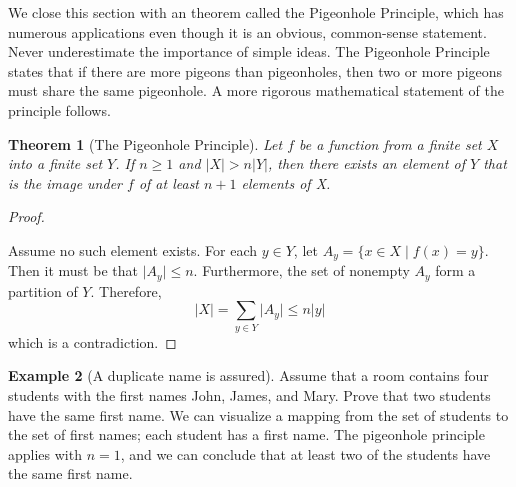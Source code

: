 \documentclass[10pt,]{book}
\theoremstyle{plain}
\newtheorem{theorem}{Theorem}[section]
\theoremstyle{definition}
\theoremstyle{definition}
\newtheorem{example}[theorem]{Example}
\theoremstyle{definition}
\begin{document}
We close this section with an theorem called the Pigeonhole Principle, which has numerous applications even though it is an obvious, common-sense statement. Never underestimate the importance of simple ideas. The Pigeonhole Principle states that if there are more pigeons than
pigeonholes, then two or more pigeons must share the same pigeonhole. A more rigorous mathematical statement of the principle follows.%
\begin{theorem}[The Pigeonhole Principle]\label{th-pigeonhole-principle}
Let \(f\) be a function from a finite set \(X\) into a finite set \(Y\). If \(n\geq 1\) and \(\lvert X\rvert > n\lvert Y\rvert\), then there exists an element of \(Y\) that is the image under \(f\) of at least \(n + 1\) elements of X.%
\end{theorem}
\begin{proof}\hypertarget{proof-1}{}
Assume no such element exists. For each \(y \in Y\), let \(A_y = \{x\in X \mid f(x) =y \}\).  Then it must be that \(\lvert A_y \rvert \leq n\).  Furthermore, the set of nonempty \(A_y\) form a partition of \(Y\).   Therefore,  
\[ \lvert X \rvert = \sum_{y\in Y}{\lvert A_y \rvert} \leq n \lvert y \rvert \]
which is a contradiction.%
\end{proof}
\begin{example}[A duplicate name is assured]\label{ex-names}
Assume that a room contains four students with the first names John, James, and Mary. Prove that two students have the same first name. We can visualize a mapping from the set of students to the set of first names; each student has a first name. The pigeonhole principle applies with \(n = 1\), and we can conclude that at least two of the students have the same first name.%
\end{example}
\typeout{************************************************}
\typeout{************************************************}
\end{document}
